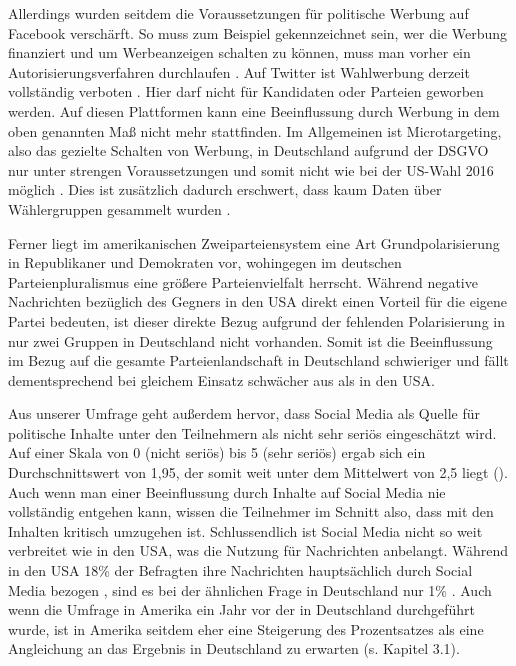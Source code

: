Allerdings wurden seitdem die Voraussetzungen für politische Werbung auf Facebook verschärft. So muss zum Beispiel gekennzeichnet sein, wer die Werbung finanziert und um Werbeanzeigen schalten zu können, muss man vorher ein Autorisierungsverfahren durchlaufen \autocite[vgl.][]{facebookPolitischeWerbung}\autocite[vgl.][]{zeitFacebookWahlwerbung}. 
Auf Twitter ist Wahlwerbung derzeit vollständig verboten \autocite[vgl.][]{twitterPolitischerInhalt}. Hier darf nicht für Kandidaten oder Parteien geworben werden. Auf diesen Plattformen kann eine Beeinflussung durch Werbung in dem oben genannten Maß nicht mehr stattfinden.
Im Allgemeinen ist Microtargeting, also das gezielte Schalten von Werbung, in Deutschland aufgrund der DSGVO nur unter strengen Voraussetzungen und somit nicht wie bei der US-Wahl 2016 möglich \autocite[vgl.][1,11]{microtargeting}. Dies ist zusätzlich dadurch erschwert, dass kaum Daten über Wählergruppen gesammelt wurden \autocite[vgl.][4,5]{microtargeting}.

Ferner liegt im amerikanischen Zweiparteiensystem eine Art \glqq Grundpolarisierung\grqq{} in Republikaner und Demokraten vor, wohingegen im deutschen Parteienpluralismus eine größere Parteienvielfalt herrscht. Während negative Nachrichten bezüglich des Gegners in den USA direkt einen Vorteil für die eigene Partei bedeuten, ist dieser direkte Bezug aufgrund der fehlenden Polarisierung in nur zwei Gruppen in Deutschland nicht vorhanden. Somit ist die Beeinflussung im Bezug auf die gesamte Parteienlandschaft in Deutschland schwieriger und fällt dementsprechend bei gleichem Einsatz schwächer aus als in den USA.

Aus unserer Umfrage geht außerdem hervor, dass Social Media als Quelle für politische Inhalte unter den Teilnehmern als nicht sehr seriös eingeschätzt wird. Auf einer Skala von 0 (nicht seriös) bis 5 (sehr seriös) ergab sich ein Durchschnittswert von 1,95, der somit weit unter dem Mittelwert von 2,5 liegt (\autocite[vgl.][]{fig:socialMediaSeriös}). Auch wenn man einer Beeinflussung durch Inhalte auf Social Media nie vollständig entgehen kann, wissen die Teilnehmer im Schnitt also, dass mit den Inhalten kritisch umzugehen ist.
Schlussendlich ist Social Media nicht so weit verbreitet wie in den USA, was die Nutzung für Nachrichten anbelangt. Während in den USA 18\% der Befragten ihre Nachrichten hauptsächlich durch Social Media bezogen \autocite[vgl.][]{AmericansSourcesNews}, sind es bei der ähnlichen Frage in Deutschland nur 1\% \autocite[vgl.][]{GerSourcesNews}. Auch wenn die Umfrage in Amerika ein Jahr vor der in Deutschland durchgeführt wurde, ist in Amerika seitdem eher eine Steigerung des Prozentsatzes als eine Angleichung an das Ergebnis in Deutschland zu erwarten (s. Kapitel 3.1).

